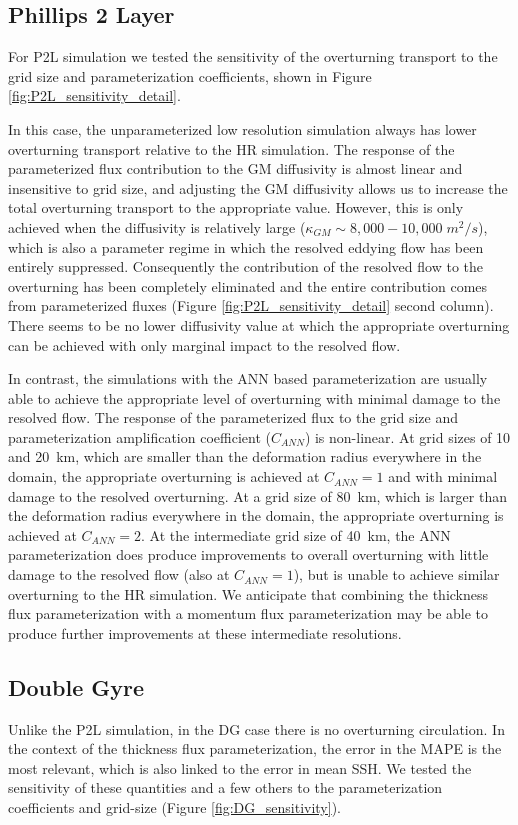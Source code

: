 \documentclass[draft]{agujournal2019}
\begin{document}
\subsection{Phillips 2 Layer}
For P2L simulation we tested the sensitivity of the overturning transport to the grid size and parameterization coefficients,  shown in Figure %
\ref{fig:P2L_sensitivity_detail}. 

In this case, the unparameterized low resolution simulation always has lower overturning transport relative to the HR simulation. The response of the parameterized flux contribution to the GM diffusivity is almost linear and insensitive to grid size, and adjusting the GM diffusivity allows us to increase the total overturning transport to the appropriate value. However, this is only achieved when the diffusivity is relatively large ($\kappa_{GM}\sim 8,000-10,000\;m^2/s$), which is also a parameter regime in which the resolved eddying flow has been entirely suppressed. Consequently the contribution of the resolved flow to the overturning has been completely eliminated and the entire contribution comes from parameterized fluxes (Figure \ref{fig:P2L_sensitivity_detail} second column). There seems to be no lower diffusivity value at which the appropriate overturning can be achieved with only marginal impact to the resolved flow. 

In contrast, the simulations with the ANN based parameterization are usually able to achieve the appropriate level of overturning with minimal damage to the resolved flow. The response of the parameterized flux to the grid size and parameterization amplification coefficient ($C_{ANN}$) is non-linear. At grid sizes of 10 and 20~km, which are smaller than the deformation radius everywhere in the domain, the appropriate overturning is achieved at $C_{ANN}=1$ and with minimal damage to the resolved overturning. At a grid size of 80~km, which is larger than the deformation radius everywhere in the domain, the appropriate overturning is achieved at $C_{ANN}=2$. At the intermediate grid size of 40~km, the ANN parameterization does produce improvements to overall overturning with little damage to the resolved flow (also at $C_{ANN}=1$), but is unable to achieve similar overturning to the HR simulation. We anticipate that combining the thickness flux parameterization with a momentum flux parameterization may be able to produce further improvements at these intermediate resolutions. 



\subsection{Double Gyre}
Unlike the P2L simulation, in the DG case there is no overturning circulation. In the context of the thickness flux parameterization, the error in the MAPE is the most relevant, which is also linked to the error in mean SSH. We tested the sensitivity of these quantities and a few others to the parameterization coefficients and grid-size (Figure \ref{fig:DG_sensitivity}). 
\end{document}

